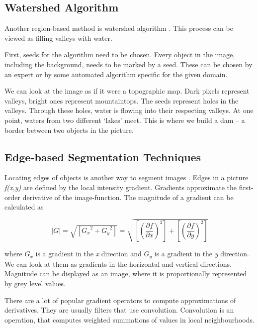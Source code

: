 \subsection{Watershed Algorithm}
Another region-based method is watershed algorithm \cite{medical-imaging-handbook}. This process can be viewed as filling valleys with water. 

First, seeds for the algorithm need to be chosen. Every object in the image, including the background, needs to be marked by a seed. These can be chosen by an expert or by some automated algorithm specific for the given domain.

We can look at the image as if it were a topographic map. Dark pixels represent valleys, bright ones represent mountaintops. The seeds represent holes in the valleys. Through these holes, water is flowing into their respecting valleys. At one point, waters from two different `lakes' meet. This is where we build a dam -- a border between two objects in the picture.

\subsection{Edge-based Segmentation Techniques}
Locating edges of objects is another way to segment images \cite{medical-imaging-handbook}. Edges in a picture \textit{f(x,y)} are defined by the local intensity gradient. Gradients approximate the first-order derivative of the image-function. The magnitude of a gradient can be calculated as

\begin{equation}
\label{eq:magnitude}
    \left | G \right | = \sqrt{ \left [ {G_{x}}^{2} + {G_{y}}^{2} \right ] } = \sqrt{\left [ \left ( \frac{\partial f}{\partial x}  \right )^{2} \right ] + 
\left [ \left ( \frac{\partial f}{\partial y}  \right )^{2} \right ]
}
\end{equation}

where \textit{$G_{x}$} is a gradient in the \textit{x} direction and \textit{$G_y$} is a gradient in the \textit{y} direction. We can look at them as gradients in the horizontal and vertical directions. Magnitude can be displayed as an image, where it is proportionally represented by grey level values. 

There are a lot of popular gradient operators to compute approximations of derivatives. They are usually filters that use convolution. Convolution is an operation, that computes weighted summations of values in local neighbourhoods. 

